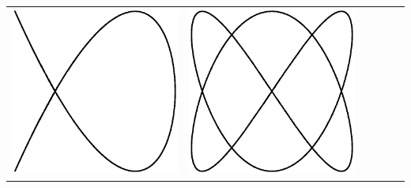 \begin{center}
\begin{tabular}{c|ccccc}
\includegraphics[scale=0.2]{05_Oscilloscope/4-3.eps} &
\includegraphics[scale=0.2]{05_Oscilloscope/4-4.eps} &

\end{tabular}
\end{center}
